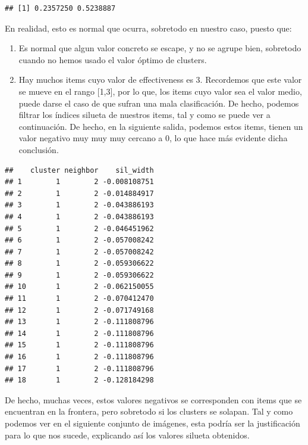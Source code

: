 \documentclass[spanish,]{article}
\newenvironment{Shaded}{\begin{snugshade}}{\end{snugshade}}
\newcommand{\KeywordTok}[1]{\textcolor[rgb]{0.13,0.29,0.53}{\textbf{#1}}}
\newcommand{\DecValTok}[1]{\textcolor[rgb]{0.00,0.00,0.81}{#1}}
\newcommand{\StringTok}[1]{\textcolor[rgb]{0.31,0.60,0.02}{#1}}
\newcommand{\OperatorTok}[1]{\textcolor[rgb]{0.81,0.36,0.00}{\textbf{#1}}}
\newcommand{\NormalTok}[1]{#1}
\begin{document}
\begin{verbatim}
## [1] 0.2357250 0.5238887
\end{verbatim}

En realidad, esto es normal que ocurra, sobretodo en nuestro caso,
puesto que:

\begin{enumerate}
\def\labelenumi{\arabic{enumi}.}
\item
  Es normal que algun valor concreto se escape, y no se agrupe bien,
  sobretodo cuando no hemos usado el valor óptimo de clusters.
\item
  Hay muchos items cuyo valor de effectiveness es 3. Recordemos que este
  valor se mueve en el rango {[}1,3{]}, por lo que, los items cuyo valor
  sea el valor medio, puede darse el caso de que sufran una mala
  clasificación. De hecho, podemos filtrar los índices silueta de
  nuestros items, tal y como se puede ver a continuación. De hecho, en
  la siguiente salida, podemos estos items, tienen un valor negativo muy
  muy muy cercano a 0, lo que hace más evidente dicha conclusión.
\end{enumerate}

\begin{Shaded}
\end{Shaded}

\begin{verbatim}
##    cluster neighbor    sil_width
## 1        1        2 -0.008108751
## 2        1        2 -0.014884917
## 3        1        2 -0.043886193
## 4        1        2 -0.043886193
## 5        1        2 -0.046451962
## 6        1        2 -0.057008242
## 7        1        2 -0.057008242
## 8        1        2 -0.059306622
## 9        1        2 -0.059306622
## 10       1        2 -0.062150055
## 11       1        2 -0.070412470
## 12       1        2 -0.071749168
## 13       1        2 -0.111808796
## 14       1        2 -0.111808796
## 15       1        2 -0.111808796
## 16       1        2 -0.111808796
## 17       1        2 -0.111808796
## 18       1        2 -0.128184298
\end{verbatim}

De hecho, muchas veces, estos valores negativos se corresponden con
items que se encuentran en la frontera, pero sobretodo si los clusters
se solapan. Tal y como podemos ver en el siguiente conjunto de imágenes,
esta podría ser la justificación para lo que nos sucede, explicando así
los valores silueta obtenidos.
\end{document}
